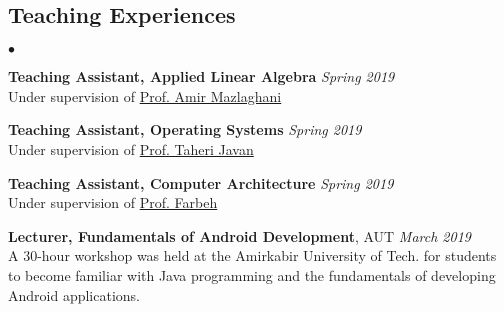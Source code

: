 \documentclass[margin,line]{res}
\newenvironment{list2}{
\begin{list}{$\bullet$}{
		\setlength{\itemsep}{0in}
		\setlength{\parsep}{0in} \setlength{\parskip}{0in}
		\setlength{\topsep}{0in} \setlength{\partopsep}{0in} 
		\setlength{\leftmargin}{0.2in}}}{\end{list}}
\begin{document}
\begin{resume}
	\section{\sc Teaching Experiences}
	\begin{list2}
		\item{\textbf{Teaching Assistant, Applied Linear Algebra} \hfill \sl{\textit{Spring 2019}}} \\ 
		Under supervision of \href{mailto:mazlaghani@aut.ac.ir}{Prof. Amir Mazlaghani} 
		\vspace{0.05in}
		\item{\textbf{Teaching Assistant, Operating Systems} \hfill \sl{\textit{Spring 2019}}}\\ 
		Under supervision of \href{mailto:nastooh@aut.ac.ir}{Prof. Taheri Javan}
		\vspace{0.05in}
		\item{\textbf{Teaching Assistant, Computer Architecture} \hfill \sl{\textit{Spring 2019}}}\\ 
		Under supervision of \href{mailto:farbeh@aut.ac.ir}{Prof. Farbeh}
		\vspace{0.05in}
		\item{\textbf{Lecturer, Fundamentals of Android Development}, AUT \hfill \sl{\textit{March 2019}}} \\
		A 30-hour workshop was held at the Amirkabir University of Tech. for students to become familiar with Java programming and the fundamentals of developing Android applications.
	\end{list2} 
	

\end{resume}
\end{document}
